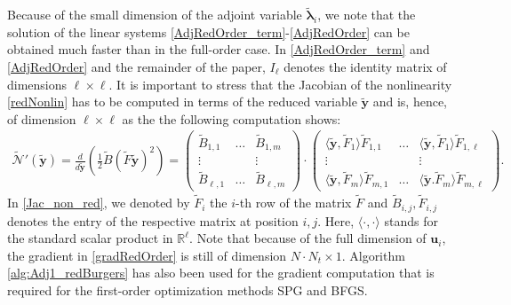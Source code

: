 Because of the small dimension of the adjoint variable $\boldsymbol{\tilde{\lambda}}_i$, we note that the solution of the linear systems \eqref{AdjRedOrder_term}-\eqref{AdjRedOrder} can be obtained much faster than in the full-order case. In \eqref{AdjRedOrder_term} and \eqref{AdjRedOrder} and the remainder of the paper, $I_\ell$ denotes the identity matrix of dimensions $\ell \times \ell$. It is important to stress that the Jacobian of the nonlinearity \eqref{redNonlin} has to be computed in terms of the reduced variable $\mathbf{\tilde y}$ and is, hence, of dimension $\ell \times \ell$ as the the following computation shows:
\begin{align}
\label{Jac_non_red}
\tilde{\mathcal{N}}'(\mathbf{\tilde{y}}) = \frac{d}{d \mathbf{\tilde{y}}} \left( \frac{1}{2} \tilde{B} (\tilde{F}\mathbf{\tilde{y}})^2 \right) = \begin{pmatrix} \tilde{B}_{1,1} & \hdots & \tilde{B}_{1,m}\\ \vdots & & \vdots \\ \tilde{B}_{\ell,1} & \hdots & \tilde{B}_{\ell,m}  \end{pmatrix} \cdot \begin{pmatrix} \mathbf{\langle \tilde{y}} , \tilde{F}_1\rangle \tilde{F}_{1,1} & \hdots & \langle \mathbf{\tilde{y}} , \tilde{F}_1 \rangle \tilde{F}_{1,\ell} \\ \vdots & & \vdots \\ \langle \mathbf{\tilde{y}} , \tilde{F}_m \rangle \tilde{F}_{m,1} & \hdots & \langle \mathbf{\tilde{y}}. \tilde{F}_m \rangle \tilde{F}_{m,\ell}  \end{pmatrix}.
\end{align}
In \eqref{Jac_non_red}, we denoted by $\tilde{F}_i$ the $i$-th row of the matrix $\tilde{F}$ and $\tilde{B}_{i,j}, \tilde{F}_{i,j}$ denotes the entry of the respective matrix at position $i,j$. Here, $\langle \cdot , \cdot \rangle$ stands for the standard scalar product in $\mathbb{R}^\ell$. Note that because of the full dimension of $\mathbf{u}_i$, the gradient in \eqref{gradRedOrder} is still of dimension $N \cdot N_t \times 1$. Algorithm \ref{alg:Adj1_redBurgers} has also been used for the gradient computation that is required for the first-order optimization methods SPG and BFGS.

